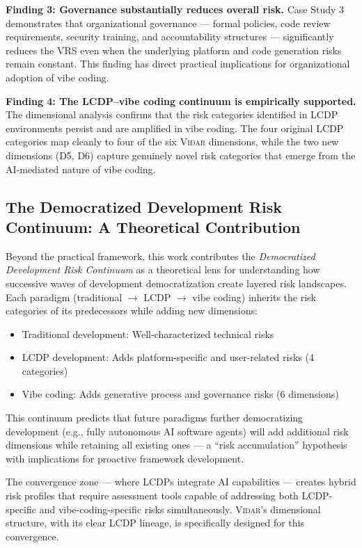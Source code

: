 \documentclass[preprint,review,12pt]{elsarticle}
\newcommand{\vidar}{\textsc{Vidar}}
\begin{document}
\textbf{Finding 3: Governance substantially reduces overall risk.} Case Study 3 demonstrates that organizational governance --- formal policies, code review requirements, security training, and accountability structures --- significantly reduces the VRS even when the underlying platform and code generation risks remain constant. This finding has direct practical implications for organizational adoption of vibe coding.

\textbf{Finding 4: The LCDP--vibe coding continuum is empirically supported.} The dimensional analysis confirms that the risk categories identified in LCDP environments \cite{hathnagoda2024assessing} persist and are amplified in vibe coding. The four original LCDP categories map cleanly to four of the six \vidar{} dimensions, while the two new dimensions (D5, D6) capture genuinely novel risk categories that emerge from the AI-mediated nature of vibe coding.


\subsection{The Democratized Development Risk Continuum: A Theoretical Contribution}
\label{subsec:continuum_theory}

Beyond the practical framework, this work contributes the \textit{Democratized Development Risk Continuum} as a theoretical lens for understanding how successive waves of development democratization create layered risk landscapes. Each paradigm (traditional $\rightarrow$ LCDP $\rightarrow$ vibe coding) inherits the risk categories of its predecessors while adding new dimensions:

\begin{itemize}
    \item Traditional development: Well-characterized technical risks
    \item LCDP development: Adds platform-specific and user-related risks (4 categories)
    \item Vibe coding: Adds generative process and governance risks (6 dimensions)
\end{itemize}

This continuum predicts that future paradigms further democratizing development (e.g., fully autonomous AI software agents) will add additional risk dimensions while retaining all existing ones --- a ``risk accumulation'' hypothesis with implications for proactive framework development.

The convergence zone --- where LCDPs integrate AI capabilities --- creates hybrid risk profiles that require assessment tools capable of addressing both LCDP-specific and vibe-coding-specific risks simultaneously. \vidar{}'s dimensional structure, with its clear LCDP lineage, is specifically designed for this convergence.
\end{document}
